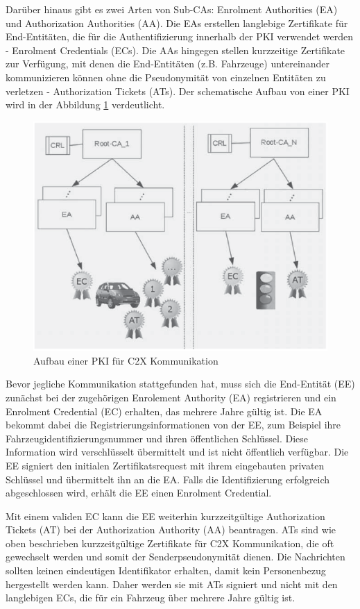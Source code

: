 Darüber hinaus gibt es zwei Arten von Sub-CAs: Enrolment Authorities (EA) und Authorization Authorities (AA). Die EAs erstellen langlebige Zertifikate für End-Entitäten, die für die Authentifizierung innerhalb der PKI verwendet werden - Enrolment Credentials (ECs). Die AAs hingegen stellen kurzzeitige Zertifikate zur Verfügung, mit denen die End-Entitäten (z.B. Fahrzeuge) untereinander kommunizieren können ohne die Pseudonymität von einzelnen Entitäten zu verletzen - Authorization Tickets (ATs). Der schematische Aufbau von einer PKI wird in der Abbildung \ref{fig:pki} verdeutlicht.

\begin{figure}
	\centering
	\includegraphics[width=0.7\linewidth]{images/PKI}
	\caption[Aufbau einer PKI für C2X Kommunikation]{Aufbau einer PKI für C2X Kommunikation \footnotemark}
	\label{fig:pki}
\end{figure}

Bevor jegliche Kommunikation stattgefunden hat, muss sich die End-Entität (EE) zunächst bei der zugehörigen Enrolement Authority (EA) registrieren und ein Enrolment Credential (EC) erhalten, das mehrere Jahre gültig ist. Die EA bekommt dabei die Registrierungsinformationen von der EE, zum Beispiel ihre Fahrzeugidentifizierungsnummer und ihren öffentlichen Schlüssel. Diese Information wird verschlüsselt übermittelt und ist nicht öffentlich verfügbar. Die EE signiert den initialen Zertifikatsrequest mit ihrem eingebauten privaten Schlüssel und übermittelt ihn an die EA. Falls die Identifizierung erfolgreich abgeschlossen wird, erhält die EE einen Enrolment Credential.

Mit einem validen EC kann die EE weiterhin kurzzeitgültige Authorization Tickets (AT) bei der Authorization Authority (AA) beantragen. ATs sind wie oben beschrieben kurzzeitgültige Zertifikate für C2X Kommunikation, die oft gewechselt werden und somit der Senderpseudonymität dienen. Die Nachrichten sollten keinen eindeutigen Identifikator erhalten, damit kein Personenbezug hergestellt werden kann. Daher werden sie mit ATs signiert und nicht mit den langlebigen ECs, die für ein Fahrzeug über mehrere Jahre gültig ist. 

